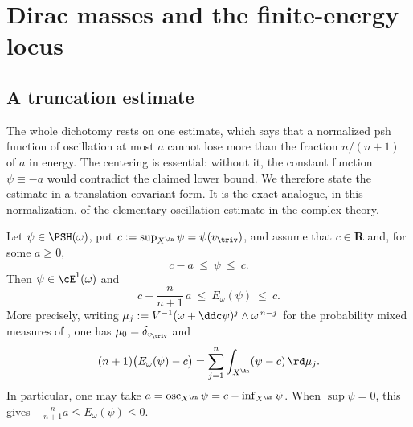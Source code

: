 \section{Dirac masses and the finite-energy locus}
\label{sec:ch49-dirac}

\subsection{A truncation estimate}
\label{sec:ch49-truncation}

The whole dichotomy rests on one estimate, which says that a normalized
psh function of oscillation at most $a$ cannot lose more than the
fraction $n/(n+1)$ of $a$ in energy.  The centering is essential:
without it, the constant function $\psi\equiv-a$ would contradict the
claimed lower bound.  We therefore state the estimate in a
translation-covariant form.  It is the exact analogue, in this
normalization, of the elementary oscillation estimate in the complex
theory.

\begin{lemma}
\label{lem:ch49-truncation-energy}
Let $\psi\in\PSH(\omega)$, put
$c:=\sup_{X^{\An}}\psi=\psi(v_{\triv})$, and assume that
$c\in\mathbf R$ and, for some $a\ge0$,
\[
                         c-a\ \le\ \psi\ \le\ c.
\]
Then $\psi\in\cE^1(\omega)$ and
\[
 c-\frac{n}{n+1}\,a\ \le\ E_\omega(\psi)\ \le\ c .
\]
More precisely, writing
$\mu_j:=V^{-1}(\omega+\ddc\psi)^j\wedge\omega^{\,n-j}$ for the
probability mixed measures of , one has
$\mu_0=\delta_{v_{\triv}}$ and
\[
 (n+1)\bigl(E_\omega(\psi)-c\bigr)
 =\sum_{j=1}^{n}\int_{X^{\An}}(\psi-c)\,\rd\mu_j .
\]
In particular, one may take
$a=\operatorname{osc}_{X^{\An}}\psi=c-\inf_{X^{\An}}\psi$.  When
$\sup\psi=0$, this gives
$-\frac{n}{n+1}a\le E_\omega(\psi)\le0$.
\end{lemma}

